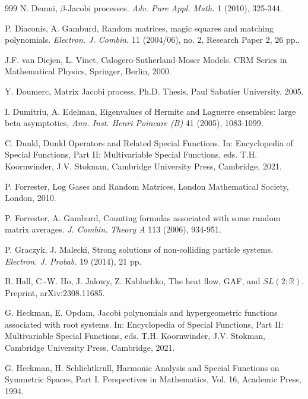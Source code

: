 \documentclass[reqno]{amsart}
\theoremstyle{plain}
\theoremstyle{definition}
\numberwithin{equation}{section}
\begin{document}
\begin{thebibliography}{999}
  N. Demni,
$\beta$-Jacobi processes.
   \textit{Adv. Pure Appl. Math.} 1 (2010), 325-344.

 P. Diaconis, A. Gamburd, 
Random matrices, magic squares and matching polynomials. 
\textit{Electron. J. Combin.} 11 (2004/06), no. 2, Research Paper 2, 26 pp.. 

   

 J.F. van Diejen, L. Vinet, Calogero-Sutherland-Moser Models.
 CRM Series in Mathematical Physics, Springer, Berlin, 2000.


  Y. Doumerc, Matrix Jacobi process, Ph.D. Thesis, Paul Sabatier University, 2005.



 I. Dumitriu, A. Edelman, Eigenvalues of Hermite and Laguerre ensembles: large beta asymptotics,
  \textit{Ann. Inst. Henri Poincare (B)} 41 (2005), 1083-1099.
  
 C. Dunkl, Dunkl Operators and Related Special Functions.
  In: Encyclopedia of Special Functions, Part II: Multivariable Special Functions, eds. T.H. Koornwinder, J.V. Stokman,
  Cambridge University Press, Cambridge, 2021.

  

    P. Forrester, Log Gases and Random Matrices, London Mathematical Society, London, 2010.


 P. Forrester, A. Gamburd, Counting formulas associated with some random matrix averages. 
\textit{J. Combin. Theory A} 113 (2006), 934-951.


 P.  Graczyk, J. Malecki, Strong solutions of non-colliding particle systems.
\textit{ Electron. J. Probab.} 19 (2014), 21 pp.

 B. Hall, C.-W. Ho, J. Jalowy, Z. Kabluchko, The heat flow, GAF, and  $SL(2; \mathbb R)$.
Preprint,  	arXiv:2308.11685. 


   G. Heckman, E. Opdam, Jacobi polynomials and hypergeometric functions associated with root systems.
  In: Encyclopedia of Special Functions, Part II: Multivariable Special Functions, eds. T.H. Koornwinder, J.V. Stokman,
  Cambridge University Press, Cambridge, 2021.

 G. Heckman, H. Schlichtkrull, 
Harmonic Analysis and Special Functions on Symmetric Spaces, Part I.  
Perspectives in Mathematics, Vol. 16, Academic Press, 1994.




\end{thebibliography}
\end{document}
